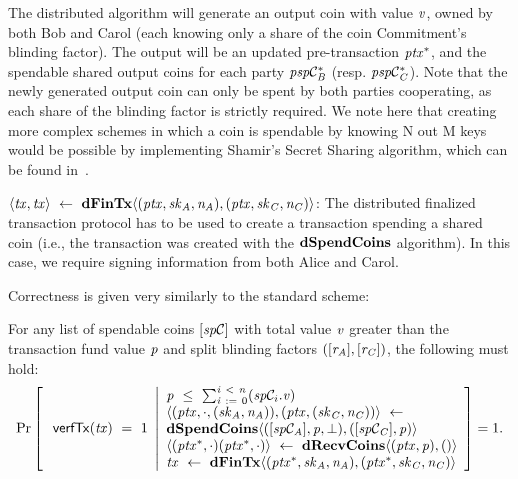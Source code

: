 \begin{definition}
\begin{asparaitem}
        The distributed algorithm will generate an output coin with value $\mathit{v}$, owned by both Bob and Carol (each knowing only a share of the coin Commitment's blinding factor).
        The output will be an updated pre-transaction $\mathit{ptx}^*$, and the spendable shared output coins for each party $\mathit{psp}\mathcal{C}_{\mathit{B}}^*$ (resp. $\mathit{psp}\mathcal{C}_{\mathit{C}}^*$).
        Note that the newly generated output coin can only be spent by both parties cooperating, as each share of the blinding factor is strictly required.
        We note here that creating more complex schemes in which a coin is spendable by knowing N out M keys would be possible by implementing Shamir's Secret Sharing algorithm, which can be found in~\cite{shamir1979share}.
        \item $\langle \mathit{tx}, \mathit{tx} \rangle ~\leftarrow~ \mathbf{dFinTx} \langle(\mathit{ptx},\mathit{sk}_{\mathit{A}},\mathit{\mathit{n}_{\mathit{A}}}),(\mathit{ptx},\mathit{sk}_{\mathit{C}},\mathit{\mathit{n}_{\mathit{C}}})\rangle$: The distributed finalized transaction protocol has to be used to create a transaction spending a shared coin (i.e., the transaction was created with the $\mathbf{dSpendCoins}$ algorithm).
        In this case, we require signing information from both Alice and Carol.
    \end{asparaitem}
\end{definition}

Correctness is given very similarly to the standard scheme:

\begin{definition}
    \label{def:atom:ext-tx-scheme-correctness}
    For any list of spendable coins $[\mathit{sp}\mathcal{C}]$ with total value $\mathit{v}$ greater than the transaction fund value $\mathit{p}$ and split blinding factors $([\mathit{r}_{\mathit{A}}], [\mathit{r}_{\mathit{C}}])$, the following must hold:
    \[
        \Pr\left[
        \begin{array}{c}
            \: \mathsf{verfTx}(\mathit{tx}) ~=~ 1
        \end{array}
        \middle\vert
        \begin{array}{l}
            \mathit{p} ~\leq~ \sum_{\mathit{i} ~:=~ 0}^{\mathit{i} ~<~ \mathit{n}}(\mathit{sp}\mathcal{C}_{i}.\mathit{v}) \\
            \langle (\mathit{ptx}, \cdot, (\mathit{sk}_{\mathit{A}}, \mathit{\mathit{n}_{\mathit{A}}})), (\mathit{ptx}, (\mathit{sk}_{\mathit{C}}, \mathit{\mathit{n}_{\mathit{C}}})) \rangle ~\leftarrow~ \\
            \mathbf{dSpendCoins} \langle ([\mathit{sp}\mathcal{C}_{\mathit{A}}],\mathit{p},\bot), ([\mathit{sp}\mathcal{C}_{\mathit{C}}],\mathit{p}) \rangle \\
            \langle (\mathit{ptx}^*, \cdot)(\mathit{ptx}^*, \cdot) \rangle ~\leftarrow~ \mathbf{dRecvCoins} \langle(\mathit{ptx},\mathit{p}), () \rangle \\
            \mathit{tx} ~\leftarrow~ \mathbf{dFinTx} \langle(\mathit{ptx}^*,\mathit{sk}_{\mathit{A}},\mathit{\mathit{n}_{\mathit{A}}}),(\mathit{ptx}^*,\mathit{sk}_{\mathit{C}},\mathit{\mathit{n}_{\mathit{C}}})\rangle
        \end{array}
        \right]=1.
    \]
\end{definition}

